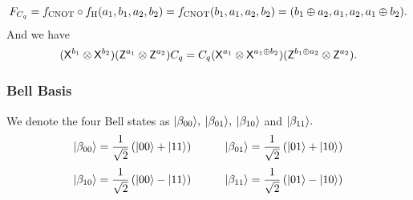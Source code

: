 $$F_{C_q}=f_{\rm CNOT}\circ f_{\rm H}(a_1,b_1, a_2,b_2)= f_{\rm CNOT}(b_1,a_1,a_2,b_2)=(b_1\oplus a_2,a_1,a_2, a_1\oplus b_2).$$
And we have $$( {\sf X}^{b_1} \otimes  {\sf X}^{b_2}) ( {\sf Z}^{a_1} \otimes  {\sf Z}^{a_2})C_q=C_q( {\sf X}^{a_1} \otimes  {\sf X}^{a_1\oplus b_2}) ( {\sf Z}^{b_1\oplus a_2} \otimes  {\sf Z}^{a_2}).$$

\subsubsection{Bell Basis}
We denote the four Bell states as ${\lvert}\beta_{00}\rangle,$  ${\lvert}\beta_{01}\rangle,$ ${\lvert}\beta_{10}\rangle$ and ${\lvert}\beta_{11}\rangle.$
$${\lvert}\beta_{00}\rangle=\frac{1}{\sqrt2}\left({\lvert}00\rangle+{\lvert}11\rangle\right) \hspace{1cm}  {\lvert}\beta_{01}\rangle=\frac{1}{\sqrt2}\left({\lvert}01\rangle+{\lvert}10\rangle\right)$$
$${\lvert}\beta_{10}\rangle=\frac{1}{\sqrt2}\left({\lvert}00\rangle-{\lvert}11\rangle\right) \hspace{1cm} {\lvert}\beta_{11}\rangle=\frac{1}{\sqrt2}\left({\lvert}01\rangle-{\lvert}10\rangle\right)$$

